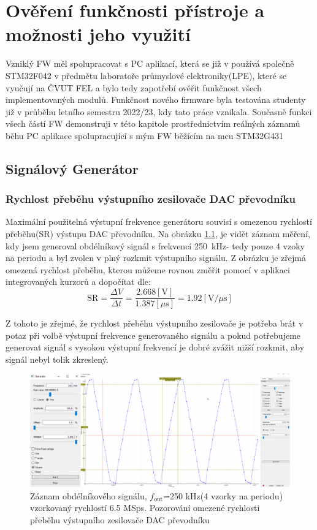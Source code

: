 \chapter{Ověření funkčnosti přístroje a možnosti jeho využití}
Vzniklý FW měl spolupracovat s PC aplikací, která se již v používá společně STM32F042 v předmětu laboratoře průmyslové elektroniky(LPE), které se vyučují na ČVUT FEL a bylo tedy zapotřebí ověřit funkčnost všech implementovaných modulů. Funkčnost nového firmware byla testována studenty již v průběhu letního semestru 2022/23, kdy tato práce vznikala. Současně funkci všech částí FW demonstruji v této kapitole prostřednictvím reálných záznamů běhu PC aplikace spolupracující s mým FW běžícím na mcu STM32G431

\section{Signálový Generátor}

\subsection{Rychlost přeběhu výstupního zesilovače DAC převodníku}
Maximální použitelná výstupní frekvence generátoru souvisí s omezenou rychlostí přeběhu(SR) výstupu DAC převodníku. Na obrázku \ref{fig:Obdelnik250kReal}, je vidět záznam měření, kdy jsem generoval obdélníkový signál s frekvencí 250~kHz- tedy pouze 4 vzoky na periodu a byl zvolen v plný rozkmit výstupního signálu. Z obrázku je zřejmá omezená rychlost přeběhu, kterou můžeme rovnou změřit pomocí v aplikaci integrovaných kurzorů a dopočítat dle:
\begin{equation}
	\text{SR}=\frac{\Delta V}{\Delta t}=\frac{2.668 [\text{V}]}{1.387 [\mu\text{s}]}=1.92 [\text{V/}\mu\text{s}]
\end{equation}

Z tohoto je zřejmé, že rychlost přeběhu výstupního zesilovače je potřeba brát v potaz při volbě výstupní frekvence generovaného signálu a pokud potřebujeme generovat signál s vysokou výstupní frekvencí je dobré zvážit nižší rozkmit, aby signál nebyl tolik zkreslený.

\begin{figure}[H]
	\centering
	\includegraphics[width=0.9\linewidth]{Figs/Screenshots/RychlostPrebehuReal.pdf}
	\caption{Záznam obdélníkového signálu, $f_{\text{out}}$=250 kHz(4 vzorky na periodu) vzorkovaný rychlostí 6.5 MSps. Pozorování omezené rychlosti přeběhu výstupního zesilovače DAC převodníku}
	\label{fig:Obdelnik250kReal}
\end{figure}
